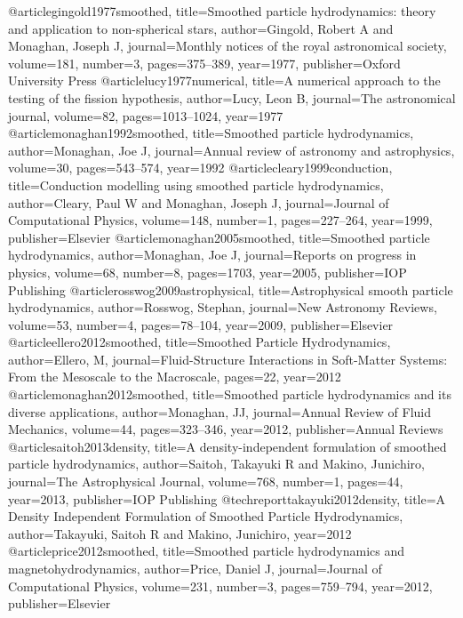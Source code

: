 @article{gingold1977smoothed,
  title={Smoothed particle hydrodynamics: theory and application to non-spherical stars},
  author={Gingold, Robert A and Monaghan, Joseph J},
  journal={Monthly notices of the royal astronomical society},
  volume={181},
  number={3},
  pages={375--389},
  year={1977},
  publisher={Oxford University Press}
}
@article{lucy1977numerical,
  title={A numerical approach to the testing of the fission hypothesis},
  author={Lucy, Leon B},
  journal={The astronomical journal},
  volume={82},
  pages={1013--1024},
  year={1977}
}
@article{monaghan1992smoothed,
  title={Smoothed particle hydrodynamics},
  author={Monaghan, Joe J},
  journal={Annual review of astronomy and astrophysics},
  volume={30},
  pages={543--574},
  year={1992}
}
@article{cleary1999conduction,
  title={Conduction modelling using smoothed particle hydrodynamics},
  author={Cleary, Paul W and Monaghan, Joseph J},
  journal={Journal of Computational Physics},
  volume={148},
  number={1},
  pages={227--264},
  year={1999},
  publisher={Elsevier}
}
@article{monaghan2005smoothed,
  title={Smoothed particle hydrodynamics},
  author={Monaghan, Joe J},
  journal={Reports on progress in physics},
  volume={68},
  number={8},
  pages={1703},
  year={2005},
  publisher={IOP Publishing}
}
@article{rosswog2009astrophysical,
  title={Astrophysical smooth particle hydrodynamics},
  author={Rosswog, Stephan},
  journal={New Astronomy Reviews},
  volume={53},
  number={4},
  pages={78--104},
  year={2009},
  publisher={Elsevier}
}
@article{ellero2012smoothed,
  title={Smoothed Particle Hydrodynamics},
  author={Ellero, M},
  journal={Fluid-Structure Interactions in Soft-Matter Systems: From the Mesoscale to the Macroscale},
  pages={22},
  year={2012}
}
@article{monaghan2012smoothed,
  title={Smoothed particle hydrodynamics and its diverse applications},
  author={Monaghan, JJ},
  journal={Annual Review of Fluid Mechanics},
  volume={44},
  pages={323--346},
  year={2012},
  publisher={Annual Reviews}
}
@article{saitoh2013density,
  title={A density-independent formulation of smoothed particle hydrodynamics},
  author={Saitoh, Takayuki R and Makino, Junichiro},
  journal={The Astrophysical Journal},
  volume={768},
  number={1},
  pages={44},
  year={2013},
  publisher={IOP Publishing}
}
@techreport{takayuki2012density,
  title={A Density Independent Formulation of Smoothed Particle Hydrodynamics},
  author={Takayuki, Saitoh R and Makino, Junichiro},
  year={2012}
}
@article{price2012smoothed,
  title={Smoothed particle hydrodynamics and magnetohydrodynamics},
  author={Price, Daniel J},
  journal={Journal of Computational Physics},
  volume={231},
  number={3},
  pages={759--794},
  year={2012},
  publisher={Elsevier}
}
